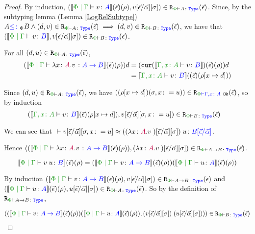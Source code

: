 \begin{framed}
\begin{proof}
            By induction, $\inLogRelPE{\deno{\gpetyperelation{v}{A}}\fundRho}{v\fundSub}{A}$.
            Since, by the subtyping lemma (Lemma \ref{LogRelSubtype}) $A\subtypep B \wedge \inLogRelPE{d}{v}{A} \implies \inLogRelPE{d}{v}{B}$, we have that $\inLogRelPE{\deno{\gpetyperelation{v}{B}}}{v\fundSub}{B}$.
        
            \case{\vfun}
        
            For all $\inLogRelPE{d}{u}{A}$, 
            \begin{align*}
                (\deno{\gpetyperelation{\lam{x}{A}{v}}{\ab}}\fundRho) d & = (\cur{\deno{\typerelation{\gax}{v}{B}}}\fundRho) d\\
                & = \deno{\typerelation{\gax}{v}{B}} (\fundRhoExt{[x\mapsto d]})\\
            \end{align*}
        
            Since $\inLogRelPE{d}{u}{A}$, we have $\inLogRelPEG{(\rho[x\mapsto d])}{(\si, x\setto u)}{\gax}$, so by induction
            \begin{align*}
                \inLogRelPE{\deno{\typerelation{\gax}{v}{B}}(\ev)(\rho[x\mapsto d])&}{v\ssub{\av}{\ev}\sub{\si, x\setto u}}{B}
            \end{align*}
        
            We can see that $\zberelation{v\ssub{\av}{\ev}{\sub{\si, x\setto u}}}{\apply{((\lam{x}{A}{v})\fundSub)}{u}}{B\ssub{\av}{\ev}}$.
        
            Hence $\inLogRelPE{(\deno{\gpetyperelation{\lam{x}{A}{v}}{\ab}}\fundRho) }{(\lam{x}{A}{v})\fundSub}{\ab}$.
        
        
        \case{\vapply}
        \begin{equation}
            \deno{\gpetyperelation{\apply{v}{u}}{B}}\fundRho = (\deno{\gpetyperelation{v}{\ab}}\fundRho)(\deno{\gpetyperelation{u}{A}}\fundRho)
        \end{equation}
        
        By induction $\inLogRelPE{\deno{\gpetyperelation{v}{\ab}}\fundRho}{v\fundSub}{\ab}$ and $\inLogRelPE{\deno{\gpetyperelation{u}{A}}\fundRho}{u\fundSub}{A}$. So by the definition of $\erelates{\P}{\ab}$, 
        
        \begin{align*}
           \inLogRelPE{(\deno{\gpetyperelation{v}{\ab}}\fundRho)(\deno{\gpetyperelation{u}{A}}\fundRho)}{\apply{(v\fundSub)}{(u\fundSub)})}{B}
        \end{align*}
        

\end{proof}
\end{framed}

